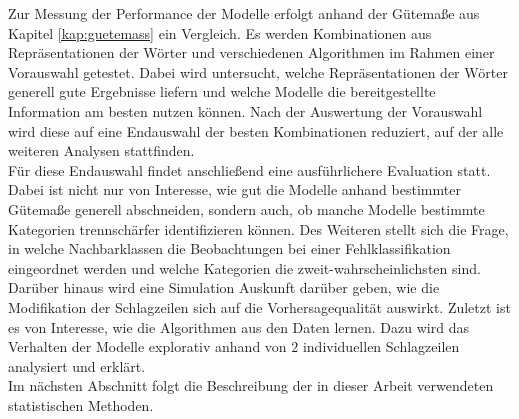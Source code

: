 \documentclass[a4paper,11pt]{article}
\begin{document}
Zur Messung der Performance der Modelle erfolgt anhand der Gütemaße aus Kapitel \ref{kap:guetemass} ein Vergleich. 
Es werden Kombinationen aus Repräsentationen der Wörter und verschiedenen Algorithmen im Rahmen einer Vorauswahl getestet. Dabei wird untersucht, welche Repräsentationen der Wörter generell gute Ergebnisse liefern und welche Modelle die bereitgestellte Information am besten nutzen können. Nach der Auswertung der Vorauswahl wird diese auf eine Endauswahl der besten Kombinationen reduziert, auf der alle weiteren Analysen stattfinden.\\
Für diese Endauswahl findet anschließend eine ausführlichere Evaluation statt. Dabei ist nicht nur von Interesse, wie gut die Modelle anhand bestimmter Gütemaße generell abschneiden, sondern auch, ob manche Modelle bestimmte Kategorien trennschärfer identifizieren können. Des Weiteren stellt sich die Frage, in welche Nachbarklassen die Beobachtungen bei einer Fehlklassifikation eingeordnet werden und welche Kategorien die zweit-wahrscheinlichsten sind. Darüber hinaus wird eine Simulation Auskunft darüber geben, wie die Modifikation der Schlagzeilen sich auf die Vorhersagequalität auswirkt. Zuletzt ist es von Interesse, wie die Algorithmen aus den Daten lernen. Dazu wird das Verhalten der Modelle explorativ anhand von $2$ individuellen Schlagzeilen analysiert und erklärt.\\
Im nächsten Abschnitt folgt die Beschreibung der in dieser Arbeit verwendeten statistischen Methoden.


\newpage
\end{document}
